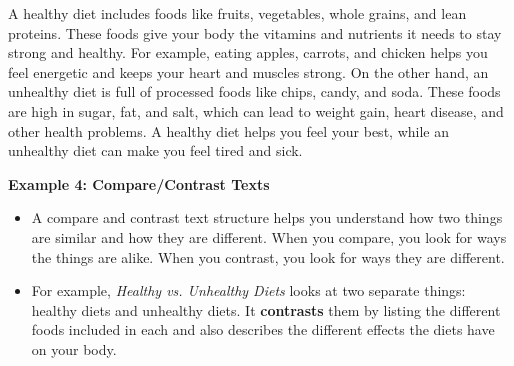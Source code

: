 \documentclass[12pt]{article}
\begin{document}
\begin{tcolorbox}[colframe=black!60, colback=white, 
coltitle=black, colbacktitle=black!15, fonttitle=\bfseries\Large, 
title=Text: Healthy vs. Unhealthy Diets, halign title=center, left=10pt, right=10pt, top=10pt, bottom=15pt]


A healthy diet includes foods like fruits, vegetables, whole grains, and lean proteins. These foods give your body the vitamins and nutrients it needs to stay strong and healthy. For example, eating apples, carrots, and chicken helps you feel energetic and keeps your heart and muscles strong. On the other hand, an unhealthy diet is full of processed foods like chips, candy, and soda. These foods are high in sugar, fat, and salt, which can lead to weight gain, heart disease, and other health problems. A healthy diet helps you feel your best, while an unhealthy diet can make you feel tired and sick.

 
\end{tcolorbox}
\vspace {0.3cm}
\begin{tcolorbox}[colframe=black!60, colback=white, 
coltitle=black, colbacktitle=black!15, fonttitle=\bfseries\Large, 
title=Examples, halign title=center, left=10pt, right=10pt, top=10pt, bottom=15pt]

\textbf{Example 4: Compare/Contrast Texts}
\begin{itemize}

    \item A compare and contrast text structure helps you understand how two things are similar and how they are different. When you compare, you look for ways the things are alike. When you contrast, you look for ways they are different.
    \item For example, \textit{Healthy vs. Unhealthy Diets} looks at two separate things: healthy diets and unhealthy diets. It \textbf{contrasts} them by listing the different foods included in each and also describes the different effects the diets have on your body. 

 
        \end{itemize}
        



\end{tcolorbox}
\end{document}
